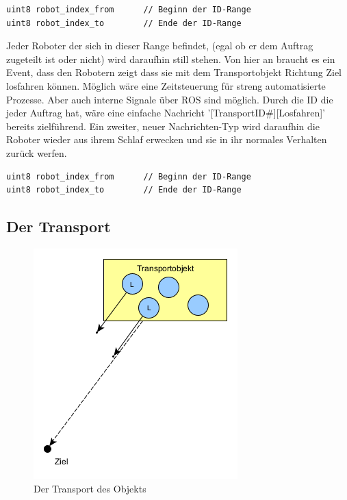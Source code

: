 \begin{lstlisting}[style=ros, title=Nachrichten-Typ: Robot\_Freeze]
uint8 robot_index_from		// Beginn der ID-Range
uint8 robot_index_to		// Ende der ID-Range
\end{lstlisting}

Jeder Roboter der sich in dieser Range befindet, (egal ob er dem Auftrag zugeteilt ist oder nicht) wird daraufhin still stehen. Von hier an braucht es ein Event, dass den Robotern zeigt dass sie mit dem Transportobjekt Richtung Ziel losfahren können. Möglich wäre eine Zeitsteuerung für streng automatisierte Prozesse. Aber auch interne Signale über ROS sind möglich. Durch die ID die jeder Auftrag hat, wäre eine einfache Nachricht '[TransportID\#][Losfahren]' bereits zielführend. Ein zweiter, neuer Nachrichten-Typ wird daraufhin die Roboter wieder aus ihrem Schlaf erwecken und sie in ihr normales Verhalten zurück werfen.

\begin{lstlisting}[style=ros, title=Nachrichten-Typ: Robot\_Continue]
uint8 robot_index_from		// Beginn der ID-Range
uint8 robot_index_to		// Ende der ID-Range
\end{lstlisting}

\subsection*{Der Transport}

\begin{figure}
	\includegraphics[width=\pictureWidthSmall,keepaspectratio]{graphics/AlgorithmusTransport.png}
	\caption{Der Transport des Objekts}
	\label{pic:AlgorithmusTransport}
\end{figure}

